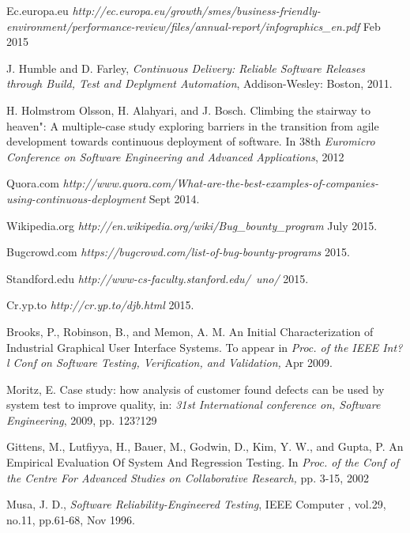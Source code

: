 \documentclass[conference]{IEEEtran}
\begin{document}
\begin{thebibliography}{1}

Ec.europa.eu \emph{http://ec.europa.eu/growth/smes/business-friendly-environment/performance-review/files/annual-report/infographics\_en.pdf} Feb 2015

J.  Humble  and  D.  Farley,  \emph{Continuous  Delivery:  Reliable  Software Releases  through  Build,  Test  and  Deplyment  Automation},  Addison-Wesley: Boston, 2011. 

H. Holmstrom Olsson, H. Alahyari, and J. Bosch. Climbing the stairway to heaven":  A multiple-case study exploring barriers in the transition from agile development towards continuous deployment of software. In 38th \emph{Euromicro Conference on Software Engineering and Advanced Applications}, 2012

Quora.com \emph{http://www.quora.com/What-are-the-best-examples-of-companies-using-continuous-deployment} Sept 2014.

Wikipedia.org \emph{http://en.wikipedia.org/wiki/Bug\_bounty\_program} July 2015.

Bugcrowd.com \emph{https://bugcrowd.com/list-of-bug-bounty-programs} 2015.

Standford.edu \emph{http://www-cs-faculty.stanford.edu/~uno/} 2015. 

Cr.yp.to \emph{http://cr.yp.to/djb.html} 2015.

Brooks, P., Robinson, B., and Memon, A. M. An Initial Characterization of Industrial Graphical User Interface Systems. To appear in \emph{Proc. of the IEEE Int?l Conf on Software Testing, Verification, and Validation,} Apr 2009.

Moritz, E.  Case study: how analysis of customer found defects can be used by system test to improve quality, in: \emph{31st International conference on, Software Engineering}, 2009, pp. 123?129

Gittens, M., Lutfiyya, H., Bauer, M., Godwin, D., Kim, Y. W., and Gupta, P. An Empirical Evaluation Of System And Regression Testing. In \emph{Proc. of the Conf of the Centre For Advanced Studies on Collaborative Research,} pp. 3-15, 2002

Musa, J. D., \emph{Software Reliability-Engineered Testing}, IEEE Computer , vol.29, no.11, pp.61-68, Nov 1996.


\end{thebibliography}
\end{document}
